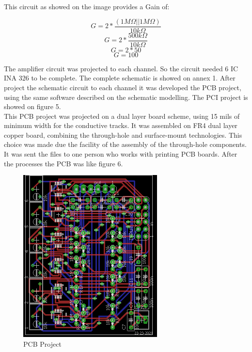 This circuit as showed on the image provides a Gain of:

$$G=2*\frac{(1M\Omega||1M\Omega)}{10k\Omega}$$
$$G=2*\frac{500k\Omega}{10k\Omega}$$
$$G=2*50$$
$$G=100$$

The amplifier circuit was projected to each channel. So the circuit needed 6 IC INA 326 to be complete. The complete schematic is showed on annex 1. After project the schematic circuit to each channel it was developed the PCB project, using the same software described on the schematic modelling. The PCI project is showed on figure 5.\\

This PCB project was projected on a dual layer board scheme, using 15 mils of minimum width for the conductive tracks. It was assembled on FR4 dual layer copper board, combining the through-hole and surface-mount technologies. This choice was made due the facility of the assembly of the through-hole components. It was sent the files to one person who works with printing PCB boards. After the processes the PCB was like figure 6.\\

\begin{figure}[!htpb]
\centering
\includegraphics[scale=1.5]{textual-elements/hardware/TCC_INA}
\caption{PCB Project}
\end{figure}

